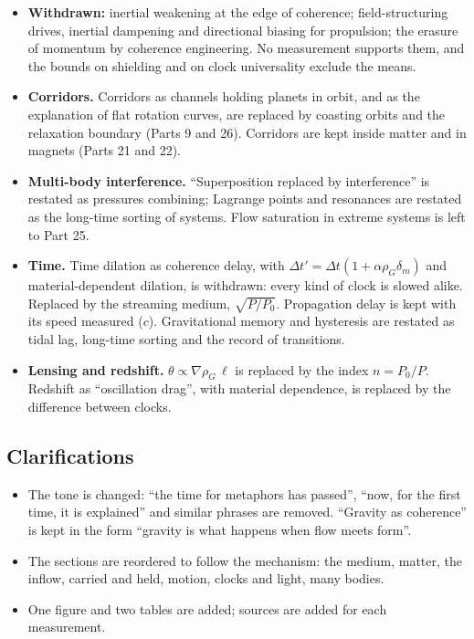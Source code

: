 \documentclass[11pt,a4paper]{article}
\begin{document}
\begin{itemize}
\item \textbf{Withdrawn:} inertial weakening at the edge of coherence; field-structuring drives, inertial dampening and directional biasing for propulsion; the erasure of momentum by coherence engineering. No measurement supports them, and the bounds on shielding and on clock universality exclude the means.
\item \textbf{Corridors.} Corridors as channels holding planets in orbit, and as the explanation of flat rotation curves, are replaced by coasting orbits and the relaxation boundary (Parts 9 and 26). Corridors are kept inside matter and in magnets (Parts 21 and 22).
\item \textbf{Multi-body interference.} ``Superposition replaced by interference'' is restated as pressures combining; Lagrange points and resonances are restated as the long-time sorting of systems. Flow saturation in extreme systems is left to Part 25.
\item \textbf{Time.} Time dilation as coherence delay, with $\Delta t' = \Delta t(1 + \alpha\rho_G\delta_m)$ and material-dependent dilation, is withdrawn: every kind of clock is slowed alike. Replaced by the streaming medium, $\sqrt{P/P_0}$. Propagation delay is kept with its speed measured ($c$). Gravitational memory and hysteresis are restated as tidal lag, long-time sorting and the record of transitions.
\item \textbf{Lensing and redshift.} $\theta \propto \nabla\rho_G\,\ell$ is replaced by the index $n = P_0/P$. Redshift as ``oscillation drag'', with material dependence, is replaced by the difference between clocks.
\end{itemize}

\subsection*{Clarifications}
\begin{itemize}
\item The tone is changed: ``the time for metaphors has passed'', ``now, for the first time, it is explained'' and similar phrases are removed. ``Gravity as coherence'' is kept in the form ``gravity is what happens when flow meets form''.
\item The sections are reordered to follow the mechanism: the medium, matter, the inflow, carried and held, motion, clocks and light, many bodies.
\item One figure and two tables are added; sources are added for each measurement.
\end{itemize}


\end{document}
